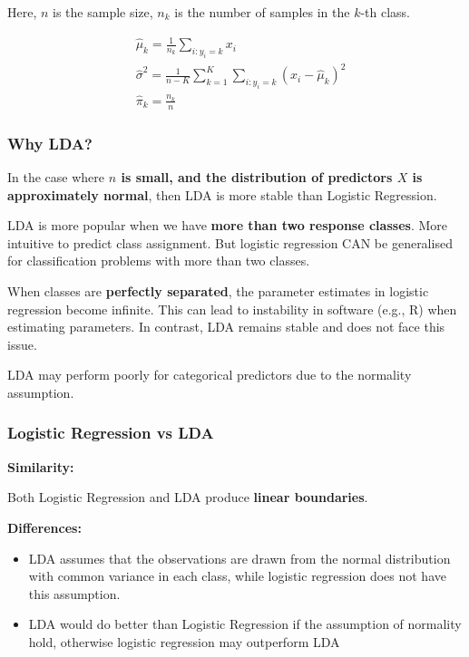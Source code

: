 Here, $n $ is the sample size, $n_k$ is the number of samples in the $k$-th class.

\begin{align*}
    & \hat{\mu}_k = \frac{1}{n_k}\sum_{i:y_i = k}x_i\\
    & \hat{\sigma}^2 = \frac{1}{n-K}\sum_{k=1}^K\sum_{i:y_i = k}(x_i - \hat{\mu}_k)^2\\
    & \hat{\pi}_k = \frac{n_k}{n}
\end{align*}

\subsubsection{Why LDA?}

\indent 

In the case where \textbf{$n$ is small, and the distribution of predictors $X$ is approximately normal}, then LDA is more stable than Logistic Regression. 

LDA is more popular when we have \textbf{more than two response classes}. More intuitive to predict class assignment. But logistic regression CAN be generalised for classification problems with more than two classes.

When classes are \textbf{perfectly separated}, the parameter estimates in logistic regression become infinite. This can lead to instability in software (e.g., R) when estimating parameters. In contrast, LDA remains stable and does not face this issue.

LDA may perform poorly for categorical predictors due to the normality assumption.

\subsubsection{Logistic Regression vs LDA}

\indent 

\noindent\textbf{Similarity:}

Both Logistic Regression and LDA produce \textbf{linear boundaries}.

\bigskip

\noindent\textbf{Differences:}

\begin{itemize}
    \item LDA assumes that the observations are drawn from the normal distribution with common variance in each class, while logistic regression does not have this assumption.
    \item LDA would do better than Logistic Regression if the assumption of normality hold, otherwise logistic regression may outperform LDA
\end{itemize}

